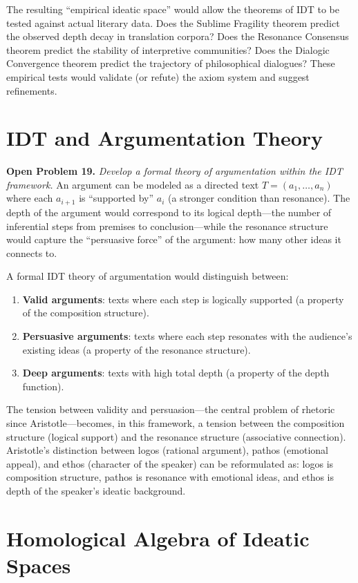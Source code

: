\documentclass[11pt,openany]{book}
\theoremstyle{definition}
\theoremstyle{plain}
\theoremstyle{remark}
\begin{document}
The resulting ``empirical ideatic space'' would allow the theorems of IDT to be tested against actual literary data. Does the Sublime Fragility theorem predict the observed depth decay in translation corpora? Does the Resonance Consensus theorem predict the stability of interpretive communities? Does the Dialogic Convergence theorem predict the trajectory of philosophical dialogues? These empirical tests would validate (or refute) the axiom system and suggest refinements.

\section{IDT and Argumentation Theory}

\textbf{Open Problem 19.} \emph{Develop a formal theory of argumentation within the IDT framework.} An argument can be modeled as a directed text $T = (a_1, \ldots, a_n)$ where each $a_{i+1}$ is ``supported by'' $a_i$ (a stronger condition than resonance). The depth of the argument would correspond to its logical depth---the number of inferential steps from premises to conclusion---while the resonance structure would capture the ``persuasive force'' of the argument: how many other ideas it connects to.

A formal IDT theory of argumentation would distinguish between:
\begin{enumerate}
\item \textbf{Valid arguments}: texts where each step is logically supported (a property of the composition structure).
\item \textbf{Persuasive arguments}: texts where each step resonates with the audience's existing ideas (a property of the resonance structure).
\item \textbf{Deep arguments}: texts with high total depth (a property of the depth function).
\end{enumerate}

The tension between validity and persuasion---the central problem of rhetoric since Aristotle---becomes, in this framework, a tension between the composition structure (logical support) and the resonance structure (associative connection). Aristotle's distinction between logos (rational argument), pathos (emotional appeal), and ethos (character of the speaker) can be reformulated as: logos is composition structure, pathos is resonance with emotional ideas, and ethos is depth of the speaker's ideatic background.

\section{Homological Algebra of Ideatic Spaces}
\end{document}
